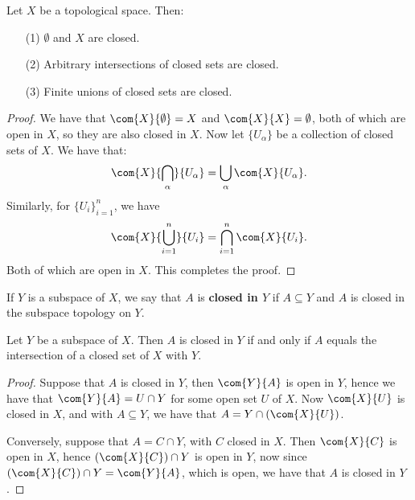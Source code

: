 \begin{theorem}\label{1.6.1}
    Let $X$ be a topological space. Then:
         \begin{enumerate}
             \item[(1)] $\emptyset$ and  $X$ are closed.

             \item[(2)] Arbitrary intersections of closed sets are closed.

             \item[(3)] Finite unions of closed sets are closed.
        \end{enumerate}
\end{theorem}
\begin{proof}
    We have that $\com{X}{\emptyset}=X$ and  $\com{X}{X}=\emptyset$, both of
    which are open in  $X$, so they are also closed in  $X$. Now let
    $\{U_{\alpha}\}$ be a collection of closed sets of  $X$. We have that:
        \begin{equation*}
            \com{X}{\bigcap_{\alpha}}{U_{\alpha}}=\bigcup_{\alpha}{\com{X}{U_{\alpha}}}.
        \end{equation*}
        Similarly, for $\{U_i\}_{i=1}^{n}$, we have
        \begin{equation*}
            \com{X}{\bigcup_{i=1}^{n}}{U_{i}}=\bigcap_{i=1}^{n}{\com{X}{U_{i}}}.
        \end{equation*}
    Both of which are open in $X$. This completes the proof.
\end{proof}

\begin{definition}
    If $Y$ is a subspace of  $X$, we say that  $A$ is  \textbf{closed in $Y$} if
    $A \subseteq Y$ and  $A$ is closed in the subspace topology on  $Y$.
\end{definition}

\begin{theorem}\label{1.6.2}
    Let $Y$ be a subspace of  $X$. Then  $A$ is closed in  $Y$ if and only if
    $A$ equals the intersection of a closed set of  $X$ with  $Y$.
\end{theorem}
\begin{proof}
    Suppose that $A$ is closed in  $Y$, then  $\com{Y}{A}$ is open in  $Y$,
    hence we have that  $\com{Y}{A}=U \cap Y$ for some open set $U$ of  $X$. Now
    $\com{X}{U}$ is closed in  $X$, and with  $A \subseteq Y$, we have that
    $A=Y \cap (\com{X}{U})$.

    Conversely, suppose that $A=C \cap Y$, with  $C$ closed in  $X$. Then
    $\com{X}{C}$ is open in  $X$, hence  $(\com{X}{C}) \cap Y$ is open in  $Y$,
    now since  $(\com{X}{C}) \cap Y=\com{Y}{A}$, which is open, we have that  $A$
    is closed in  $Y$.
\end{proof}

